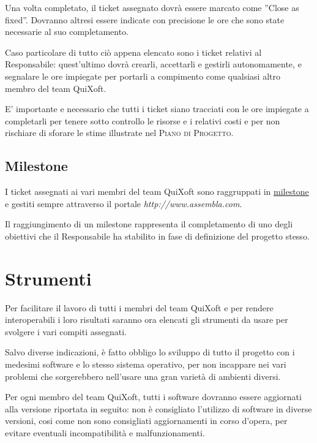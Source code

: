 \documentclass[11pt,a4paper]{article}
\begin{document}
Una volta completato, il ticket assegnato dovrà essere marcato come ''Close as fixed''. Dovranno altresi essere indicate con precisione le ore che sono state necessarie al suo completamento.

Caso particolare di tutto ciò appena elencato sono i ticket relativi al Responsabile: quest'ultimo dovrà crearli, accettarli e gestirli autonomamente, e segnalare le ore impiegate per portarli a compimento come qualsiasi altro membro del team QuiXoft.

E' importante e necessario che tutti i ticket siano tracciati con le ore impiegate a completarli per tenere sotto controllo le risorse e i relativi costi e per non rischiare di sforare le stime illustrate nel \textsc{Piano di Progetto}.
\subsection{Milestone}
I ticket assegnati ai vari membri del team QuiXoft sono raggruppati in \underline{milestone} e gestiti sempre attraverso il portale \textit{http://www.assembla.com}.

Il raggiungimento di un milestone rappresenta il completamento di uno degli obiettivi che il Responsabile ha stabilito in fase di definizione del progetto stesso.
\section{Strumenti}
Per facilitare il lavoro di tutti i membri del team QuiXoft e per rendere interoperabili i loro risultati saranno ora elencati gli strumenti da usare per svolgere i vari compiti assegnati.

Salvo diverse indicazioni, è fatto obbligo lo sviluppo di tutto il progetto con i medesimi software e lo stesso sistema operativo, per non incappare nei vari problemi che sorgerebbero nell'usare una gran varietà di ambienti diversi.

Per ogni membro del team QuiXoft, tutti i software dovranno essere aggiornati alla versione riportata in seguito: non è consigliato l'utilizzo di software in diverse versioni, cosi come non sono consigliati aggiornamenti in corso d'opera, per evitare eventuali incompatibilità e malfunzionamenti.
\end{document}
